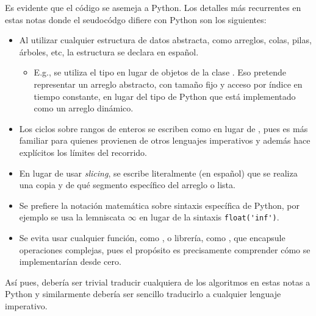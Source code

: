 Es evidente que el código se asemeja a Python. Los detalles más recurrentes en estas notas donde el seudocódgo difiere con Python son los siguientes:
\begin{itemize}
  \item Al utilizar cualquier estructura de datos abstracta, como arreglos, colas, pilas, árboles, etc, la estructura se declara en español.
  \begin{itemize}
    \item E.g., se utiliza el tipo  en lugar de objetos de la clase . Eso pretende representar un arreglo abstracto, con tamaño fijo y acceso por índice en tiempo constante, en lugar del tipo  de Python que está implementado como un arreglo dinámico.
  \end{itemize}
  \item Los ciclos sobre rangos de enteros se escriben como  en lugar de , pues es más familiar para quienes provienen de otros lenguajes imperativos y además hace explícitos los límites del recorrido.
  \item En lugar de usar \textit{slicing}, se escribe literalmente (en español) que se realiza una copia y de qué segmento específico del arreglo o lista.
  \item Se prefiere la notación matemática sobre sintaxis específica de Python, por ejemplo se usa la lemniscata \(\infty\) en lugar de la sintaxis \verb|float('inf')|.
  \item Se evita usar cualquier función, como , o librería, como , que encapsule operaciones complejas, pues el propósito es precisamente comprender cómo se implementarían desde cero.
\end{itemize}

Así pues, debería ser trivial traducir cualquiera de los algoritmos en estas notas a Python y similarmente debería ser sencillo traducirlo a cualquier lenguaje imperativo.
